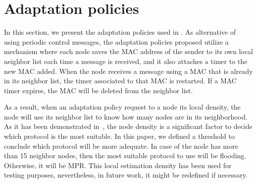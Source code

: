
\section{Adaptation policies}




In this section, we present the adaptation policies used in .
As alternative of using periodic control messages, the adaptation policies proposed utilize a mechanism where each node saves the MAC address of the sender to its own local neighbor list each time a message is received, and it also attaches a timer to the new MAC added.
When the node receives a message using a MAC that is already in its neighbor list, the timer associated to that MAC is restarted.
If a MAC timer expires, the MAC will be deleted from the neighbor list.

As a result, when an adaptation policy request to a node its local density, the node will use its neighbor list to know how many nodes are in its neighborhood.
As it has been demonstrated in~\cite{DensityMobDrivenEval}, the node density is a significant factor to decide which protocol is the most suitable.
In this paper, we defined a threshold to conclude which protocol will be more adequate.
In case of the node has more than 15 neighbor nodes, then the most suitable protocol to use will be flooding. Otherwise, it will be MPR.
This local estimation density has been used for testing purposes, nevertheless, in future work, it might be redefined if necessary.





